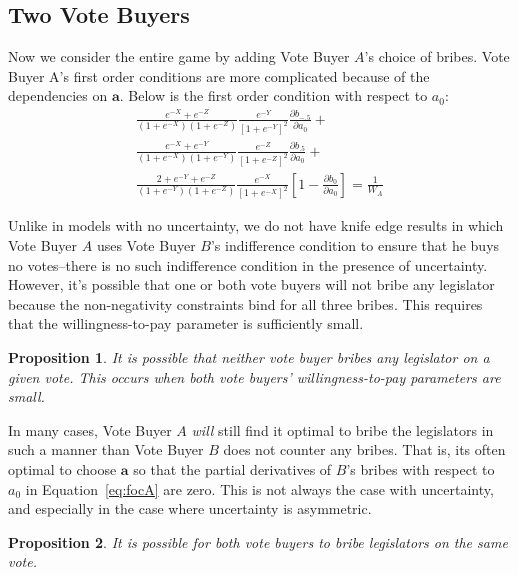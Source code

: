 \documentclass[12pt]{article}
\newtheorem{proposition}{Proposition}
\begin{document}
		
\subsection{Two Vote Buyers}		
Now we consider the entire game by adding Vote Buyer $A$'s choice of bribes. Vote Buyer A's first order conditions are more complicated because of the dependencies on $\bm a$. Below is the first order condition with respect to $a_0$:
			 \begin{multline}
					 \frac{e^{-X} + e^{-Z}}{\left(1+e^{-X}\right)\left(1+e^{-Z}\right)} \frac{e^{-Y}}{\left[1+e^{-Y}\right]^2} \frac{\partial b_{-.5}}{\partial a_0} + \\ 
					\frac{e^{-X} + e^{-Y}}{\left(1+e^{-X}\right)\left(1+e^{-Y}\right)} \frac{e^{-Z}}{\left[1+e^{-Z}\right]^2}\frac{\partial b_{.5}}{\partial a_0} + \\
					\frac{2+e^{-Y} + e^{-Z}}{\left(1+e^{-Y}\right)\left(1+e^{-Z}\right)} \frac{e^{-X}}{\left[1+e^{-X}\right]^2}\left[1 - \frac{\partial b_0}{\partial a_0} \right] = \frac{1}{W_A}
					\label{eq:focA}
				\end{multline}

Unlike in models with no uncertainty, we do not have knife edge results in which Vote Buyer $A$ uses Vote Buyer $B$'s indifference condition to ensure that he buys no votes--there is no such indifference condition in the presence of uncertainty. However, it's possible that one or both vote buyers will not bribe any legislator because the non-negativity constraints bind for all three bribes. This requires that the willingness-to-pay parameter is sufficiently small.
		
\begin{proposition}
  It is possible that neither vote buyer bribes any legislator on a given vote. This occurs when both vote buyers' willingness-to-pay parameters are small.
\end{proposition}

In many cases, Vote Buyer $A$ \textit{will} still find it optimal to bribe the legislators in such a manner than Vote Buyer $B$ does not counter any bribes. That is, its often optimal to choose $\bm a$ so that the partial derivatives of $B$'s bribes with respect to $a_0$ in Equation~\ref{eq:focA} are zero. This is not always the case with uncertainty, and especially in the case where uncertainty is asymmetric.

\begin{proposition}
  It is possible for both vote buyers to bribe legislators on the same vote.
\end{proposition}
\end{document}

